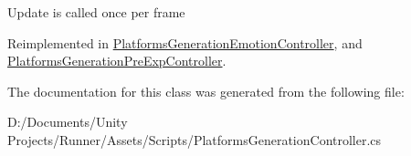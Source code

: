 Update is called once per frame 

Reimplemented in \mbox{\hyperlink{class_platforms_generation_emotion_controller_a9df024fe907661ae1f126782f84a76fd}{Platforms\+Generation\+Emotion\+Controller}}, and \mbox{\hyperlink{class_platforms_generation_pre_exp_controller_a21734bbe5479a03708e00e308ca384cb}{Platforms\+Generation\+Pre\+Exp\+Controller}}.



The documentation for this class was generated from the following file\+:\begin{DoxyCompactItemize}
\item 
D\+:/\+Documents/\+Unity Projects/\+Runner/\+Assets/\+Scripts/Platforms\+Generation\+Controller.\+cs\end{DoxyCompactItemize}
